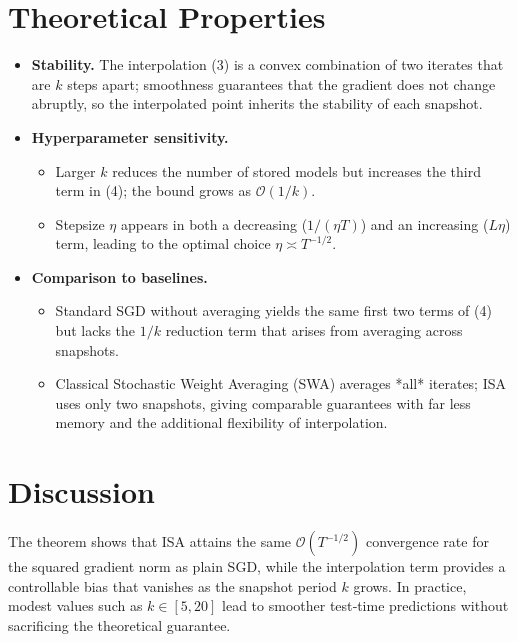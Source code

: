 \documentclass{article}
\begin{document}
\section*{Theoretical Properties}
\begin{itemize}
\item \textbf{Stability.} The interpolation (3) is a convex combination of
two iterates that are $k$ steps apart; smoothness guarantees that the
gradient does not change abruptly, so the interpolated point inherits the
stability of each snapshot.

\item \textbf{Hyperparameter sensitivity.}
    \begin{itemize}
    \item Larger $k$ reduces the number of stored models but increases the
          third term in (4); the bound grows as $\mathcal{O}(1/k)$.
    \item Stepsize $\eta$ appears in both a decreasing ($1/(\eta T)$) and an
          increasing ($L\eta$) term, leading to the optimal choice
          $\eta\asymp T^{-1/2}$.
    \end{itemize}
\item \textbf{Comparison to baselines.}
    \begin{itemize}
    \item Standard SGD without averaging yields the same first two terms of
          (4) but lacks the $1/k$ reduction term that arises from
          averaging across snapshots.
    \item Classical Stochastic Weight Averaging (SWA) averages *all*
          iterates; ISA uses only two snapshots, giving comparable
          guarantees with far less memory and the additional flexibility
          of interpolation.
    \end{itemize}
\end{itemize}

\section*{Discussion}
The theorem shows that ISA attains the same $\mathcal{O}(T^{-1/2})$
convergence rate for the squared gradient norm as plain SGD, while
the interpolation term provides a controllable bias that vanishes as the
snapshot period $k$ grows.  In practice, modest values such as $k\in[5,20]$
lead to smoother test‑time predictions without sacrificing the theoretical
guarantee.
\end{document}
